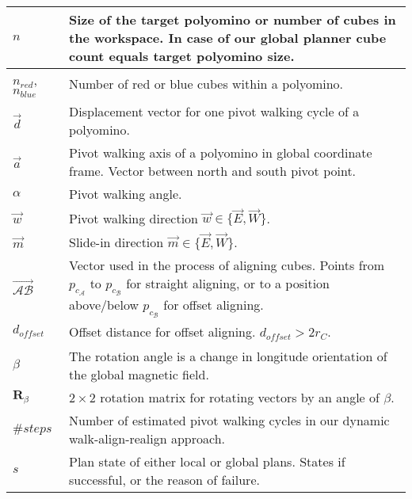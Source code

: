 \begin{xltabular}{\textwidth}{ l  X }
	$n$
	&
	Size of the target polyomino or number of cubes in the workspace.
	In case of our global planner cube count equals target polyomino size.
	\\ \midrule
	
	$n_\textit{red}$, $n_\textit{blue}$
	&
	Number of red or blue cubes within a polyomino.
	\\ \midrule
	
	$\vec{d}$
	&
	Displacement vector for one pivot walking cycle of a polyomino.
	\\ \midrule
	
	$\vec{a}$
	&
	Pivot walking axis of a polyomino in global coordinate frame.
	Vector between north and south pivot point.
	\\ \midrule
	
	$\alpha$
	&
	Pivot walking angle.
	\\ \midrule
	
	$\vec{w}$
	&
	Pivot walking direction $\vec{w} \in \{ \vec{E}, \vec{W} \}$.
	\\ \midrule
	
	$\vec{m}$
	&
	Slide-in direction $\vec{m} \in \{ \vec{E}, \vec{W} \}$.
	\\ \midrule
	
	$\overrightarrow{\mathcal{A}\mathcal{B}}$
	&
	Vector used in the process of aligning cubes.
	Points from $p_{c_\mathcal{A}}$ to $p_{c_\mathcal{B}}$ for straight aligning, or to a position above/below $p_{c_\mathcal{B}}$ for offset aligning.
	\\ \midrule
	
	$d_\textit{offset}$
	&
	Offset distance for offset aligning.
	$d_\textit{offset} > 2 r_C$.
	\\ \midrule
	
	$\beta$  
	&
	The rotation angle is a change in longitude orientation of the global magnetic field.
	\\ \midrule
	
	$\mathbf{R}_\beta$  
	&
	$2 \times 2$ rotation matrix for rotating vectors by an angle of $\beta$.
	\\ \midrule
	
	$\#\textit{steps}$
	&
	Number of estimated pivot walking cycles in our dynamic walk-align-realign approach.
	\\ \midrule
	
	$s$
	&
	Plan state of either local or global plans. States if successful, or the reason of failure.
	\\ \midrule
	

\end{xltabular}
